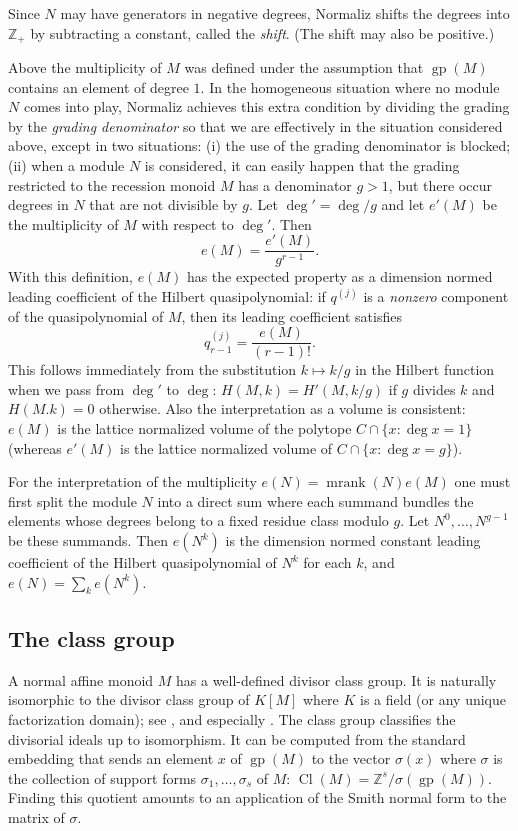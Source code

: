 \documentclass[12pt,a4paper]{scrartcl}
\theoremstyle{definition}
\def\ZZ{{\mathbb Z}}
\DeclareMathOperator{\gp}{gp}
\DeclareMathOperator{\mrank}{mrank}
\DeclareMathOperator{\Cl}{Cl}
\begin{document}
Since $N$ may have generators in negative degrees, Normaliz shifts the degrees into $\ZZ_+$ by subtracting a constant, called the \emph{shift}. (The shift may also be positive.)

Above the multiplicity of $M$ was defined under the assumption that $\gp(M)$ contains an element of degree $1$. In the homogeneous situation where no module $N$ comes into play, Normaliz achieves this extra condition by dividing the grading by the \emph{grading denominator} so that we are effectively in the situation considered above, except in two situations:
(i) the use of the grading denominator is blocked;  (ii)   when a module $N$ is considered, it can easily happen that the grading restricted to the recession monoid $M$ has a denominator $g>1$, but there occur degrees in $N$ that are not divisible by $g$.  Let $\deg'=\deg/g$ and let $e'(M)$ be the multiplicity of $M$ with respect to $\deg'$. Then
$$
e(M)=\frac{e'(M)}{g^{r-1}}.
$$
With this definition, $e(M)$ has the expected property as a dimension normed leading coefficient of the Hilbert quasipolynomial: if $q^{(j)}$ is a \emph{nonzero} component of the quasipolynomial of $M$, then its leading coefficient satisfies
$$
q_{r-1}^{(j)}=\frac{e(M)}{(r-1)!}.
$$
This follows immediately from the substitution $k\mapsto k/g$ in the Hilbert function when we pass from $\deg'$ to $\deg$: $H(M,k)=H'(M,k/g)$ if $g$ divides $k$ and $H(M.k)=0$ otherwise.  Also the interpretation as a volume is consistent: $e(M)$ is the lattice normalized volume of the polytope $C\cap\{x:\deg x=1 \}$ (whereas $e'(M)$ is the lattice normalized volume of $C\cap\{x:\deg x=g \}$).

For the interpretation of the multiplicity $e(N)=\mrank(N)e(M)$ one must first split the module $N$ into a direct sum where each summand bundles the elements whose degrees belong to a fixed residue class modulo $g$. Let $N^0,\dots,N^{g-1}$ be these summands. Then $e(N^k)$ is the dimension normed constant leading coefficient of the Hilbert quasipolynomial of $N^k$ for each $k$, and $e(N)=\sum_k e(N^k)$.

\subsection{The class group}

A normal affine monoid $M$ has a well-defined divisor class group. It is naturally isomorphic to the divisor class group of $K[M]$ where $K$ is a field (or any unique factorization domain); see \cite[4.F]{BG}, and especially \cite[4.56]{BG}. The class group classifies the divisorial ideals up to isomorphism. It can be computed from the standard embedding that sends an element $x$ of $\gp(M)$ to the vector $\sigma(x)$ where $\sigma$ is the collection of support forms $\sigma_1,\dots,\sigma_s$ of $M$: $\Cl(M)=\ZZ^s/\sigma(\gp(M))$. Finding this quotient amounts to an application of the Smith normal form to the matrix of $\sigma$.
\end{document}
